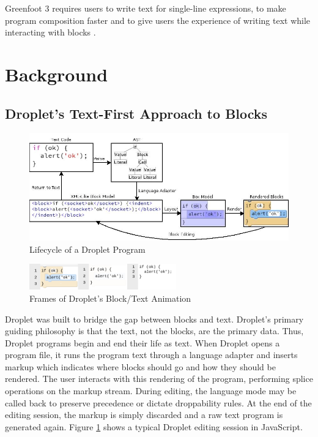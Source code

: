 \documentclass[conference]{IEEEtran}
\begin{document}
Greenfoot 3 requires users to write text for single-line expressions, to make program composition faster and to give users the experience of writing text while interacting with blocks \cite{Greenfoot3}.

\section{Background}
\subsection{Droplet's Text-First Approach to Blocks}

\begin{figure}[!t]
\centering
\includegraphics[width=5in]{image11.jpg}
\caption{Lifecycle of a Droplet Program}
\label{lifecycle}
\end{figure}

\begin{figure}[!t]
\centering
\includegraphics[width=2.5in]{image12.png}
\caption{Frames of Droplet's Block/Text Animation}
\label{anim}
\end{figure}

Droplet was built to bridge the gap between blocks and text. Droplet's primary guiding philosophy is that the text, not the blocks, are the primary data. Thus, Droplet programs begin and end their life as text. When Droplet opens a program file, it runs the program text through a language adapter and inserts markup which indicates where blocks should go and how they should be rendered. The user interacts with this rendering of the program, performing splice operations on the markup stream. During editing, the language mode may be called back to preserve precedence or dictate droppability rules. At the end of the editing session, the markup is simply discarded and a raw text program is generated again. Figure \ref{lifecycle} shows a typical Droplet editing session in JavaScript.
\end{document}
